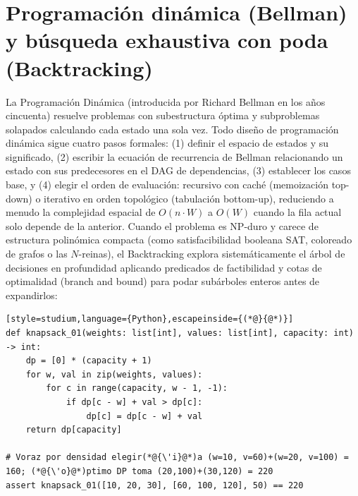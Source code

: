 \documentclass{book}
\begin{document}
\section{Programación dinámica (Bellman) y búsqueda exhaustiva con poda (Backtracking)}

La Programación Dinámica (introducida por Richard Bellman en los años cincuenta) resuelve problemas con subestructura óptima y subproblemas solapados calculando cada estado una sola vez. Todo diseño de programación dinámica sigue cuatro pasos formales: (1) definir el espacio de estados y su significado, (2) escribir la ecuación de recurrencia de Bellman relacionando un estado con sus predecesores en el DAG de dependencias, (3) establecer los casos base, y (4) elegir el orden de evaluación: recursivo con caché (memoización top-down) o iterativo en orden topológico (tabulación bottom-up), reduciendo a menudo la complejidad espacial de \(O(n \cdot W)\) a \(O(W)\) cuando la fila actual solo depende de la anterior.
Cuando el problema es NP-duro y carece de estructura polinómica compacta (como satisfacibilidad booleana SAT, coloreado de grafos o las \(N\)-reinas), el Backtracking explora sistemáticamente el árbol de decisiones en profundidad aplicando predicados de factibilidad y cotas de optimalidad (branch and bound) para podar subárboles enteros antes de expandirlos:
\begin{lstlisting}[style=studium,language={Python},escapeinside={(*@}{@*)}]
def knapsack_01(weights: list[int], values: list[int], capacity: int) -> int:
    dp = [0] * (capacity + 1)
    for w, val in zip(weights, values):
        for c in range(capacity, w - 1, -1):
            if dp[c - w] + val > dp[c]:
                dp[c] = dp[c - w] + val
    return dp[capacity]

# Voraz por densidad elegir(*@{\'i}@*)a (w=10, v=60)+(w=20, v=100) = 160; (*@{\'o}@*)ptimo DP toma (20,100)+(30,120) = 220
assert knapsack_01([10, 20, 30], [60, 100, 120], 50) == 220
\end{lstlisting}
\end{document}
